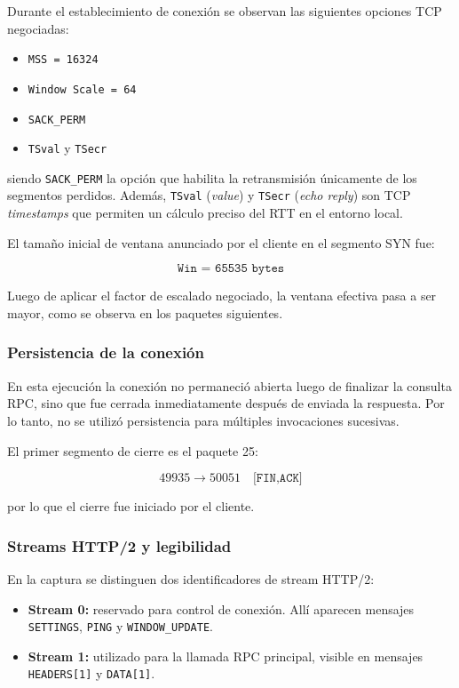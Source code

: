 \documentclass[a4paper,12pt]{article}
\begin{document}
Durante el establecimiento de conexión se observan las siguientes opciones TCP negociadas:

\begin{itemize}
    \item \texttt{MSS = 16324}
    \item \texttt{Window Scale = 64}
    \item \texttt{SACK\_PERM} 
    \item \texttt{TSval} y \texttt{TSecr} 
\end{itemize}

siendo \texttt{SACK\_PERM} la opción que habilita la retransmisión únicamente de los segmentos perdidos. Además, \texttt{TSval} (\textit{value}) y \texttt{TSecr} (\textit{echo reply}) son TCP \textit{timestamps} que permiten un cálculo preciso del RTT en el entorno local. 

El tamaño inicial de ventana anunciado por el cliente en el segmento SYN fue:

\[
\texttt{Win = 65535 \ bytes}
\]

Luego de aplicar el factor de escalado negociado, la ventana efectiva pasa a ser mayor, como se observa en los paquetes siguientes.

\subsubsection{Persistencia de la conexión}

En esta ejecución la conexión no permaneció abierta luego de finalizar la consulta RPC, sino que fue cerrada inmediatamente después de enviada la respuesta. Por lo tanto, no se utilizó persistencia para múltiples invocaciones sucesivas.

El primer segmento de cierre es el paquete 25:

\[
49935 \rightarrow 50051 \quad \texttt{[FIN,ACK]}
\]

por lo que el cierre fue iniciado por el cliente.

\subsubsection{Streams HTTP/2 y legibilidad}

En la captura se distinguen dos identificadores de stream HTTP/2:

\begin{itemize}
    \item \textbf{Stream 0:} reservado para control de conexión. Allí aparecen mensajes \texttt{SETTINGS}, \texttt{PING} y \texttt{WINDOW\_UPDATE}.
    
    \item \textbf{Stream 1:} utilizado para la llamada RPC principal, visible en mensajes \texttt{HEADERS[1]} y \texttt{DATA[1]}.
\end{itemize}
\end{document}
